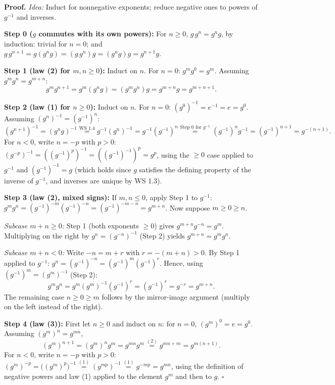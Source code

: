 \documentclass[11pt]{report}
\renewenvironment{proof}[1][Proof]{\noindent\textbf{#1.} }{\hfill$\square$\par\vspace{5pt}}
\begin{document}
\begin{proof}
\textit{Idea:} Induct for nonnegative exponents; reduce negative ones to powers of $g^{-1}$ and inverses.\par
\textbf{Step 0 ($g$ commutes with its own powers):} For $n \geq 0$, $g \, g^n = g^n g$, by induction: trivial for $n = 0$; and $g \, g^{n+1} = g (g^n g) = (g \, g^n) g = (g^n g) g = g^{n+1} g$.

\textbf{Step 1 (law (2) for $m, n \geq 0$):} Induct on $n$. For $n = 0$: $g^m g^0 = g^m$. Assuming $g^m g^n = g^{m+n}$:
\[ g^m g^{n+1} = g^m (g^n g) = (g^m g^n) g = g^{m+n} g = g^{m+n+1}. \]

\textbf{Step 2 (law (1) for $n \geq 0$):} Induct on $n$. For $n = 0$: $(g^0)^{-1} = e^{-1} = e = g^{0}$. Assuming $(g^n)^{-1} = (g^{-1})^n$:
\[ (g^{n+1})^{-1} = (g^n g)^{-1} \overset{\text{WS 1.4}}{=} g^{-1} (g^n)^{-1} = g^{-1} (g^{-1})^n \overset{\text{Step 0 for } g^{-1}}{=} (g^{-1})^n g^{-1} = (g^{-1})^{n+1} = g^{-(n+1)}. \]
For $n < 0$, write $n = -p$ with $p > 0$: $(g^{-p})^{-1} = ((g^{-1})^p)^{-1} = ((g^{-1})^{-1})^p = g^p$, using the $\geq 0$ case applied to $g^{-1}$ and $(g^{-1})^{-1} = g$ (which holds since $g$ satisfies the defining property of the inverse of $g^{-1}$, and inverses are unique by WS 1.3).

\textbf{Step 3 (law (2), mixed signs):} If $m, n \leq 0$, apply Step 1 to $g^{-1}$: $g^m g^n = (g^{-1})^{-m}(g^{-1})^{-n} = (g^{-1})^{-m-n} = g^{m+n}$. Now suppose $m \geq 0 \geq n$.

\textit{Subcase $m + n \geq 0$:} Step 1 (both exponents $\geq 0$) gives $g^{m+n} g^{-n} = g^m$. Multiplying on the right by $g^n = (g^{-n})^{-1}$ (Step 2) yields $g^{m+n} = g^m g^n$.

\textit{Subcase $m + n < 0$:} Write $-n = m + r$ with $r = -(m+n) > 0$. By Step 1 applied to $g^{-1}$: $g^n = (g^{-1})^{-n} = (g^{-1})^{m} (g^{-1})^{r}$. Hence, using $(g^{-1})^m = (g^m)^{-1}$ (Step 2):
\[ g^m g^n = g^m (g^m)^{-1} (g^{-1})^r = (g^{-1})^r = g^{-r} = g^{m+n}. \]
The remaining case $n \geq 0 \geq m$ follows by the mirror-image argument (multiply on the left instead of the right).

\textbf{Step 4 (law (3)):} First let $n \geq 0$ and induct on $n$: for $n = 0$, $(g^m)^0 = e = g^0$. Assuming $(g^m)^n = g^{mn}$,
\[ (g^m)^{n+1} = (g^m)^n g^m = g^{mn} g^m \overset{(2)}{=} g^{mn + m} = g^{m(n+1)}. \]
For $n < 0$, write $n = -p$ with $p > 0$: $(g^m)^{-p} = \big((g^m)^p\big)^{-1} \overset{(1)}{=} (g^{mp})^{-1} \overset{(1)}{=} g^{-mp} = g^{mn}$, using the definition of negative powers and law (1) applied to the element $g^m$ and then to $g$.
\end{proof}
\end{document}
